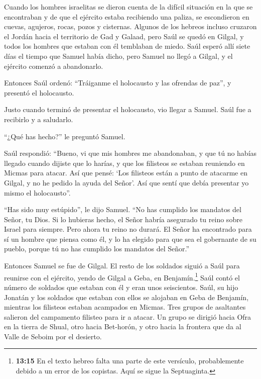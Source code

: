  Cuando los hombres israelitas se dieron cuenta de la
difícil situación en la que se encontraban y de que el ejército estaba
recibiendo una paliza, se escondieron en cuevas, agujeros, rocas, pozos
y cisternas.  Algunos de los hebreos incluso cruzaron el
Jordán hacia el territorio de Gad y Galaad, pero Saúl se quedó en
Gilgal, y todos los hombres que estaban con él temblaban de miedo.
 Saúl esperó allí siete días el tiempo que Samuel había
dicho, pero Samuel no llegó a Gilgal, y el ejército comenzó a
abandonarlo.

 Entonces Saúl ordenó: ``Tráiganme el holocausto y las
ofrendas de paz'', y presentó el holocausto.

 Justo cuando terminó de presentar el holocausto, vio
llegar a Samuel. Saúl fue a recibirlo y a saludarlo.

 ``¿Qué has hecho?'' le preguntó Samuel.

Saúl respondió: ``Bueno, vi que mis hombres me abandonaban, y que tú no
habías llegado cuando dijiste que lo harías, y que los filisteos se
estaban reuniendo en Micmas para atacar.  Así que pensé:
`Los filisteos están a punto de atacarme en Gilgal, y no he pedido la
ayuda del Señor'. Así que sentí que debía presentar yo mismo el
holocausto''.

 ``Has sido muy estúpido'', le dijo Samuel. ``No has
cumplido los mandatos del Señor, tu Dios. Si lo hubieras hecho, el Señor
habría asegurado tu reino sobre Israel para siempre.  Pero
ahora tu reino no durará. El Señor ha encontrado para sí un hombre que
piensa como él, y lo ha elegido para que sea el gobernante de su pueblo,
porque tú no has cumplido los mandatos del Señor.''

 Entonces Samuel se fue de Gilgal. El resto de los soldados
siguió a Saúl para reunirse con el ejército, yendo de Gilgal a Geba, en
Benjamín.\footnote{\textbf{13:15} En el texto hebreo falta una parte de
  este versículo, probablemente debido a un error de los copistas. Aquí
  se sigue la Septuaginta.} Saúl contó el número de soldados que estaban
con él y eran unos seiscientos.  Saúl, su hijo Jonatán y
los soldados que estaban con ellos se alojaban en Geba de Benjamín,
mientras los filisteos estaban acampados en Micmas.  Tres
grupos de asaltantes salieron del campamento filisteo para ir a atacar.
Un grupo se dirigió hacia Ofra en la tierra de Shual,  otro
hacia Bet-horón, y otro hacia la frontera que da al Valle de Seboim por
el desierto.

